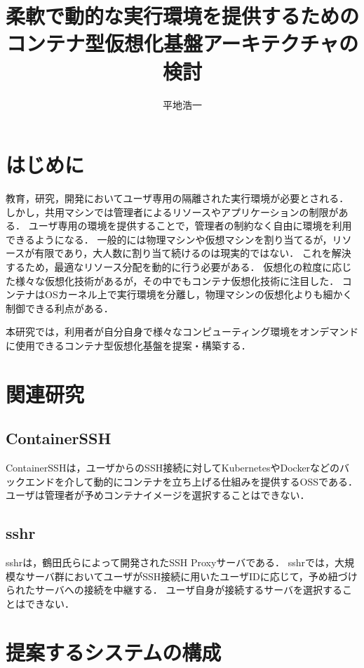 \documentclass[dvipdfmx]{cs-handout}
\title{柔軟で動的な実行環境を提供するための\\コンテナ型仮想化基盤アーキテクチャの検討}
\author{平地浩一}
\newcommand{\Note}[1]{\noindent \textbf{\textcolor{blue}{#1}}}
\begin{document}
\maketitle

\section{はじめに}

教育，研究，開発においてユーザ専用の隔離された実行環境が必要とされる．
しかし，共用マシンでは管理者によるリソースやアプリケーションの制限がある．
ユーザ専用の環境を提供することで，管理者の制約なく自由に環境を利用できるようになる．
一般的には物理マシンや仮想マシンを割り当てるが，リソースが有限であり，大人数に割り当て続けるのは現実的ではない．
これを解決するため，最適なリソース分配を動的に行う必要がある．
仮想化の粒度に応じた様々な仮想化技術があるが，その中でもコンテナ仮想化技術に注目した．
コンテナはOSカーネル上で実行環境を分離し，物理マシンの仮想化よりも細かく制御できる利点がある．

本研究では，利用者が自分自身で様々なコンピューティング環境をオンデマンドに使用できるコンテナ型仮想化基盤を提案・構築する．

\section{関連研究}

\subsection{ContainerSSH}

ContainerSSHは，ユーザからのSSH接続に対してKubernetesやDockerなどのバックエンドを介して動的にコンテナを立ち上げる仕組みを提供するOSSである\cite{ContainerSSH}．
ユーザは管理者が予めコンテナイメージを選択することはできない．

\subsection{sshr}

sshrは，鶴田氏らによって開発されたSSH Proxyサーバである\cite{Tsuruta2020}．
sshrでは，大規模なサーバ群においてユーザがSSH接続に用いたユーザIDに応じて，予め紐づけられたサーバへの接続を中継する．
ユーザ自身が接続するサーバを選択することはできない．

\section{提案するシステムの構成}
\end{document}
